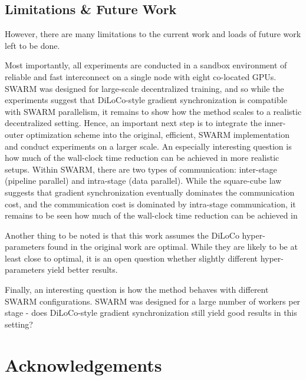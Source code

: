 \documentclass{article}
\begin{document}
\subsection{Limitations \& Future Work}

However, there are many limitations to the current work and loads of future work 
left to be done.

Most importantly, all experiments are conducted in a sandbox environment of
reliable and fast interconnect on a single node with eight co-located GPUs.
SWARM was designed for large-scale decentralized training, and so while the 
experiments suggest that DiLoCo-style gradient synchronization is compatible
with SWARM parallelism, it remains to show how the method scales to a realistic
decentralized setting. Hence, an important next step is to integrate the
inner-outer optimization scheme into the original, efficient, SWARM
implementation and conduct experiments on a larger scale. An especially
interesting question is how much of the wall-clock time reduction can be
achieved in more realistic setups.  Within SWARM, there are two types of
communication: inter-stage (pipeline parallel) and intra-stage (data parallel).
While the square-cube law~\cite{ryabinin2023} suggests that gradient
synchronization eventually dominates the communication cost, and the
communication cost is dominated by intra-stage communication, it remains to be
seen how much of the wall-clock time reduction can be achieved in


Another thing to be noted is that this work assumes the DiLoCo hyper-parameters
found in the original work are optimal. While they are likely to be at least
close to optimal, it is an open question whether slightly different hyper-parameters
yield better results.

Finally, an interesting question is how the method behaves with different SWARM
configurations. SWARM was designed for a large number of workers per stage -
does DiLoCo-style gradient synchronization still yield good results in this
setting?

\section*{Acknowledgements}
\label{sec:acknowledgements}
\end{document}
